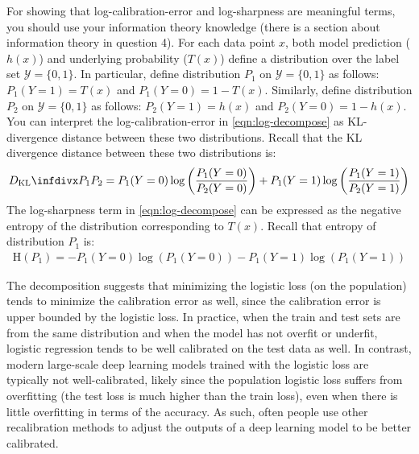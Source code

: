 For showing that log-calibration-error and log-sharpness are meaningful terms, you should use your information theory knowledge (there is a section about information theory in question 4).
%
For each data point $x$, both model prediction ($h(x)$) and underlying probability ($T(x)$) define a distribution over the label set $\mathcal{Y} = \{0,1\}$.
In particular, define distribution $P_1$ on $\mathcal{Y}=\{0,1\}$ as follows:
$P_1(Y=1) = T(x)$ and $P_1(Y=0) = 1-T(x)$. 
Similarly, define distribution $P_2$ on $\mathcal{Y}=\{0,1\}$ as follows: $P_2(Y=1) = h(x)$ and $P_2(Y=0) = 1-h(x)$. 
You can interpret the log-calibration-error in \eqref{eqn:log-decompose} as KL-divergence distance between these two distributions. 
Recall that the KL divergence distance between these two distributions is:
\begin{align}
	\infdiv{P_1}{P_2} = P_1(Y=0) \log\left(\frac{P_1(Y=0)}{P_2(Y=0)}\right) + P_1(Y=1) \log\left(\frac{P_1(Y=1)}{P_2(Y=1)}\right) 
\end{align} 
The log-sharpness term in \eqref{eqn:log-decompose} can be expressed as the negative entropy of the distribution corresponding to $T(x)$. 
Recall that entropy of distribution $P_1$ is:
\begin{align}
	\text {H}(P_1) = -P_1(Y=0)\log(P_1(Y=0)) - P_1(Y=1)\log(P_1(Y=1))
\end{align}

The decomposition suggests that minimizing the logistic loss (on the population) tends to minimize the calibration error as well, since the calibration error is upper bounded by the logistic loss. In practice, when the train and test sets are from the same distribution and when the model has not overfit or underfit, logistic regression tends to be well calibrated on the test data as well.  In contrast, modern large-scale deep learning models trained with the logistic loss are typically not well-calibrated, likely since the population  logistic loss suffers from overfitting (the test loss is much higher than the train loss), even when there is little overfitting in terms of the accuracy. As such, often people use other recalibration methods to adjust the outputs of a deep learning model to be better calibrated.
